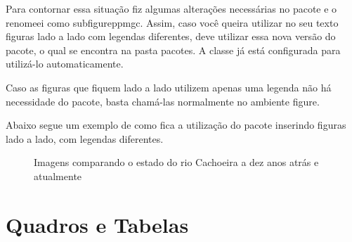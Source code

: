 Para contornar essa situação fiz algumas alterações necessárias no pacote e o renomeei como {\ttfamily subfigureppmgc}. Assim, caso você queira utilizar no seu texto figuras lado a lado com legendas diferentes, deve utilizar essa nova versão do  pacote, o qual se encontra na pasta {\ttfamily pacotes}. A classe já está configurada para utilizá-lo automaticamente.

Caso as figuras que fiquem lado a lado  utilizem apenas uma legenda não há necessidade do pacote, basta chamá-las normalmente no ambiente {\ttfamily figure}.

Abaixo segue um exemplo de como fica a utilização do pacote inserindo figuras lado a lado, com legendas diferentes.\\

\begin{figure}[!htb]
 \caption{Imagens comparando o estado do rio Cachoeira a dez anos atrás e atualmente} \label{fig:estadorc}
\end{figure}
\section{Quadros e Tabelas}
\label{sec:tabelas}

